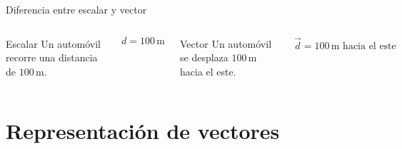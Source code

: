 \documentclass[aspectratio=169,11pt]{beamer}
\begin{document}
\begin{frame}{Diferencia entre escalar y vector}

\begin{columns}


\begin{block}{Escalar}
Un automóvil recorre una distancia
de \(100\,\mathrm{m}\).
\end{block}

\[
d=100\,\mathrm{m}
\]


\begin{block}{Vector}
Un automóvil se desplaza
\(100\,\mathrm{m}\) hacia el este.
\end{block}

\[
\vec d=100\,\mathrm{m}
\text{ hacia el este}
\]

\end{columns}

\vspace{0.5cm}

\centering
{}

\end{frame}

\section{Representación de vectores}
\end{document}
